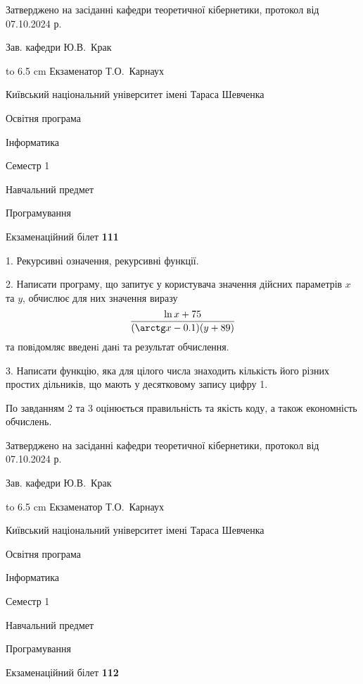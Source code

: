 \documentclass[12pt, ukrainian]{article}
\begin{document}
{\smallskip\smallskip \begin {scriptsize} Затверджено на засіданні кафедри теоретичної кібернетики, протокол   від   07.10.2024 р.\par\smallskip\smallskip\smallskip\smallskip
{\parbox {6.5 cm} {Зав. кафедри \dotfill Ю.В.~Крак}}\hspace {0.7cm} {\hbox to 6.5 cm { Екзаменатор \dotfill Т.О.~Карнаух}} \end{scriptsize}}
\vspace{0.9cm}
{{\begin {scriptsize}\par
{ \center  Київський національний університет імені Тараса Шевченка \par}
{\parbox {5 cm}{Освітня програма \hfill}{\parbox {7 cm}{Інформатика\hfill}}\parbox {6 cm}{\hfill Семестр 1}}\par
{\parbox {5 cm} {Навчальний предмет \hfill}\parbox {7 cm}{Програмування \hfill}\parbox {6cm}{\hfill}\par}\vspace{-15pt} \end{scriptsize}}{\center Екзаменаційний білет \No \textbf { 111 }\par}}
{%
1. Рекурсивні означення, рекурсивні функції.%
\par
2. Написати програму, що запитує у користувача значення дійсних параметрів $x$ та $y$, обчислює для них значення виразу 
$$\frac{\ln x + 75}{(\arctg x - 0.1) (y + 89)}$$ 
та повiдомляє введенi данi та результат обчислення.

\par
3. Написати функцію, яка для цілого числа знаходить кількість його різних простих дільників, що мають у десятковому запису цифру 1.

По завданням 2 та 3 оцінюється правильність та якість коду, а також економність обчислень.

}
{\smallskip\smallskip \begin {scriptsize} Затверджено на засіданні кафедри теоретичної кібернетики, протокол   від   07.10.2024 р.\par\smallskip\smallskip\smallskip\smallskip
{\parbox {6.5 cm} {Зав. кафедри \dotfill Ю.В.~Крак}}\hspace {0.7cm} {\hbox to 6.5 cm { Екзаменатор \dotfill Т.О.~Карнаух}} \end{scriptsize}}
\newpage
{{\begin {scriptsize}\par
{ \center  Київський національний університет імені Тараса Шевченка \par}
{\parbox {5 cm}{Освітня програма \hfill}{\parbox {7 cm}{Інформатика\hfill}}\parbox {6 cm}{\hfill Семестр 1}}\par
{\parbox {5 cm} {Навчальний предмет \hfill}\parbox {7 cm}{Програмування \hfill}\parbox {6cm}{\hfill}\par}\vspace{-15pt} \end{scriptsize}}{\center Екзаменаційний білет \No \textbf { 112 }\par}}
\end{document}
